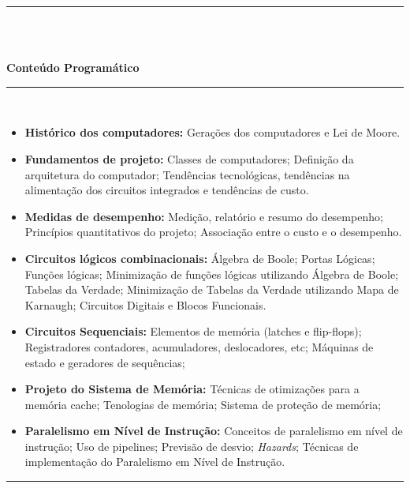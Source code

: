 \noindent\rule{16.5cm}{0.4pt}\\
\\
\vspace{-12mm}
\begin{center}\textbf{Conteúdo Programático}\end{center}
\vspace{-5mm}
\noindent\rule{16.5cm}{0.4pt}
\\
\begin{itemize}

 \item \textbf{Histórico dos computadores:} Gerações dos computadores e  Lei de Moore.
 \item \textbf{Fundamentos de projeto:} Classes de computadores; Definição da arquitetura do computador; Tendências tecnológicas, tendências na alimentação dos circuitos integrados e tendências de custo.
 \item \textbf{Medidas de desempenho:} Medição, relatório e resumo do desempenho; Princípios quantitativos do projeto; Associação entre o custo e o desempenho.
 \item \textbf{Circuitos lógicos combinacionais:} Álgebra de Boole; Portas Lógicas; Funções lógicas; Minimização de funções lógicas utilizando Álgebra de Boole; Tabelas da Verdade; Minimização de Tabelas da Verdade utilizando Mapa de Karnaugh;  Circuitos Digitais e Blocos Funcionais.
 \item \textbf{Circuitos Sequenciais:} Elementos de memória (latches e flip-flops); Registradores contadores, acumuladores, deslocadores, etc; Máquinas de estado e geradores de sequências; 
 \item \textbf{Projeto do Sistema de Memória:} Técnicas de otimizações para a memória cache; Tenologias de memória; Sistema de proteção de memória;
 \item \textbf{Paralelismo em Nível de Instrução:} Conceitos de paralelismo em nível de instrução; Uso de pipelines; Previsão de desvio; \textit{Hazards}; Técnicas de implementação do Paralelismo em Nível de Instrução. %

\end{itemize}
\noindent\rule{16.5cm}{0.4pt}\\
\\
